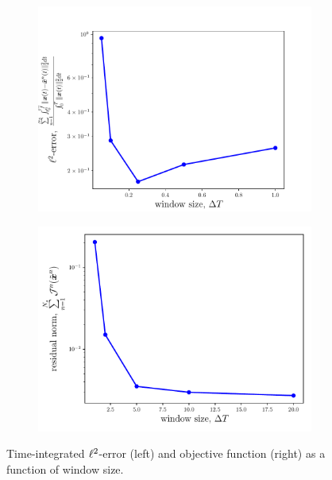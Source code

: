 \begin{figure}
\begin{center}
\begin{subfigure}[t]{0.47\textwidth}
\includegraphics[trim={0cm 0cm 0cm 0cm},clip,width=1.\linewidth]{figs/cavity_new/error_vs_windowSize.pdf}
\end{subfigure}
\begin{subfigure}[t]{0.45\textwidth}
\includegraphics[trim={0cm 0cm 0cm 0cm},clip,width=1.\linewidth]{figs/cavity_new/residual_vs_windowSize.pdf}
\end{subfigure}
\end{center}
\caption{Time-integrated $\ell^2$-error (left) and objective function (right) as a function of window size.}
\label{fig:cav_results2}
\end{figure}




